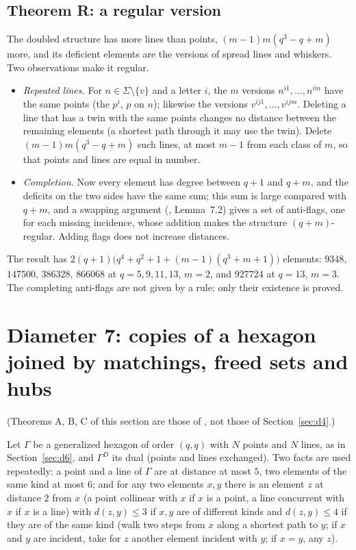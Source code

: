 \documentclass[11pt]{amsart}
\theoremstyle{definition}
\theoremstyle{remark}
\begin{document}
\subsection{Theorem R: a regular version}\label{ssec:thmR}
The doubled structure has more lines than points, $(m-1)m(q^3-q+m)$ more, and its deficient elements are the versions of spread lines and whiskers. Two observations make it regular.
\begin{itemize}[leftmargin=1.5em]
\item \emph{Repeated lines.} For $n\in \Sigma\setminus\{v\}$ and a letter $i$, the $m$ versions $n^{i1},\dots,n^{im}$ have the same points (the $p^i$, $p$ on $n$); likewise the versions $v^{ij1},\dots,v^{ijm}$. Deleting a line that has a twin with the same points changes no distance between the remaining elements (a shortest path through it may use the twin). Delete $(m-1)m(q^3-q+m)$ such lines, at most $m-1$ from each class of $m$, so that points and lines are equal in number.
\item \emph{Completion.} Now every element has degree between $q+1$ and $q+m$, and the deficits on the two sides have the same sum; this sum is large compared with $q+m$, and a swapping argument (, Lemma~7.2) gives a set of anti-flags, one for each missing incidence, whose addition makes the structure $(q+m)$-regular. Adding flags does not increase distances.
\end{itemize}
The result has $2(q+1)\bigl(q^4+q^2+1+(m-1)(q^3+m+1)\bigr)$ elements: $9348$, $147500$, $386328$, $866068$ at $q=5,9,11,13$, $m=2$, and $927724$ at $q=13$, $m=3$. The completing anti-flags are not given by a rule; only their existence is proved.

\section{Diameter 7: copies of a hexagon joined by matchings, freed sets and hubs}\label{sec:d7}

(Theorems A, B, C of this section are those of , not those of Section~\ref{sec:d4}.)

Let $\Gamma$ be a generalized hexagon of order $(q,q)$ with $N$ points and $N$ lines, as in Section~\ref{sec:d6}, and $\Gamma^D$ its dual (points and lines exchanged). Two facts are used repeatedly: a point and a line of $\Gamma$ are at distance at most $5$, two elements of the same kind at most $6$; and for any two elements $x,y$ there is an element $z$ at distance $2$ from $x$ (a point collinear with $x$ if $x$ is a point, a line concurrent with $x$ if $x$ is a line) with $d(z,y)\le 3$ if $x,y$ are of different kinds and $d(z,y)\le 4$ if they are of the same kind (walk two steps from $x$ along a shortest path to $y$; if $x$ and $y$ are incident, take for $z$ another element incident with $y$; if $x=y$, any $z$).
\end{document}
